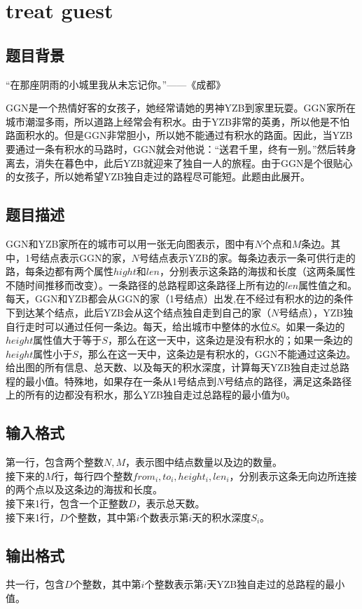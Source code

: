 \documentclass[12pt]{ctexart}
\begin{document}
\newpage
\section{treat guest}
\subsection{题目背景}
“在那座阴雨的小城里我从未忘记你。”——《成都》

GGN是一个热情好客的女孩子，她经常请她的男神YZB到家里玩耍。GGN家所在城市潮湿多雨，所以道路上经常会有积水。由于YZB非常的英勇，所以他是不怕路面积水的。但是GGN非常胆小，所以她不能通过有积水的路面。因此，当YZB要通过一条有积水的马路时，GGN就会对他说：“送君千里，终有一别。”然后转身离去，消失在暮色中，此后YZB就迎来了独自一人的旅程。由于GGN是个很贴心的女孩子，所以她希望YZB独自走过的路程尽可能短。此题由此展开。
\subsection{题目描述}
GGN和YZB家所在的城市可以用一张无向图表示，图中有$N$个点和$M$条边。其中，1号结点表示GGN的家，$N$号结点表示YZB的家。每条边表示一条可供行走的路，每条边都有两个属性$hight$和$len$，分别表示这条路的海拔和长度（这两条属性不随时间推移而改变）。一条路径的总路程即这条路径上所有边的$len$属性值之和。每天，GGN和YZB都会从GGN的家（1号结点）出发,在不经过有积水的边的条件下到达某个结点，此后YZB会从这个结点独自走到自己的家（$N$号结点），YZB独自行走时可以通过任何一条边。每天，给出城市中整体的水位$S$。如果一条边的$height$属性值大于等于$S$，那么在这一天中，这条边是没有积水的；如果一条边的$height$属性小于$S$，那么在这一天中，这条边是有积水的，GGN不能通过这条边。给出图的所有信息、总天数、以及每天的积水深度，计算每天YZB独自走过总路程的最小值。特殊地，如果存在一条从1号结点到$N$号结点的路径，满足这条路径上的所有的边都没有积水，那么YZB独自走过总路程的最小值为0。
\subsection{输入格式}
\noindent 第一行，包含两个整数$N,M$，表示图中结点数量以及边的数量。\\
接下来的$M$行，每行四个整数$from_i,to_i,height_i,len_i$，分别表示这条无向边所连接的两个点以及这条边的海拔和长度。\\
接下来1行，包含一个正整数$D$，表示总天数。\\
接下来1行，$D$个整数，其中第$i$个数表示第$i$天的积水深度$S_i$。
\subsection{输出格式}
共一行，包含$D$个整数，其中第$i$个整数表示第$i$天YZB独自走过的总路程的最小值。
\end{document}

